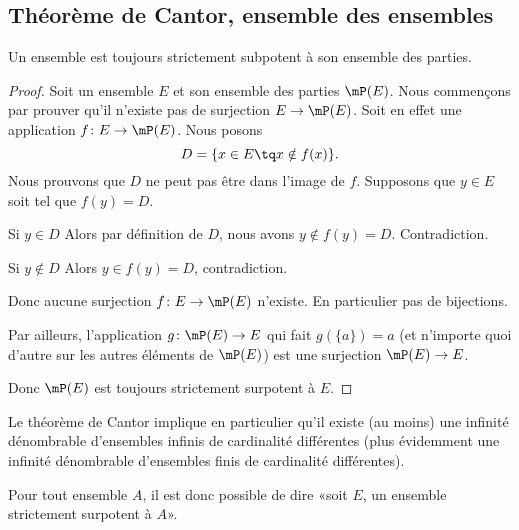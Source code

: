 \subsection{Théorème de Cantor, ensemble des ensembles}

\begin{theorem}     \label{THOooJPNFooWSxUhd}
    Un ensemble est toujours strictement subpotent à son ensemble des parties.
\end{theorem}

\begin{proof}
    Soit un ensemble \( E\) et son ensemble des parties \( \mP(E)\). Nous commençons par prouver qu'il n'existe pas de surjection \( E\to \mP(E)\). Soit en effet une application \( f\colon E\to \mP(E)\). Nous posons
    \begin{equation}
        D=\{ x\in E\tq x\notin f(x) \}.
    \end{equation}
    Nous prouvons que \( D\) ne peut pas être dans l'image de \( f\). Supposons que \( y\in E\) soit tel que \( f(y)=D\).
    \begin{subproof}
        \item[Si \( y\in D\)]
            Alors par définition de \( D\), nous avons \( y\notin f(y)=D\). Contradiction.
        \item[Si \( y\notin D\)]
            Alors \( y\in f(y)=D\), contradiction.
    \end{subproof}
    Donc aucune surjection \( f\colon E\to \mP(E)\) n'existe. En particulier pas de bijections.

    Par ailleurs, l'application \( g\colon \mP(E)\to E\) qui fait \( g(\{ a \})=a\) (et n'importe quoi d'autre sur les autres éléments de \( \mP(E)\)) est une surjection \( \mP(E)\to E\).

    Donc \( \mP(E)\) est toujours strictement surpotent à \( E\).
\end{proof}

\begin{normaltext}
    Le théorème de Cantor implique en particulier qu'il existe (au moins) une infinité dénombrable d'ensembles infinis de cardinalité différentes (plus évidemment une infinité dénombrable d'ensembles finis de cardinalité différentes).

    Pour tout ensemble \( A\), il est donc possible de dire «soit \( E\), un ensemble strictement surpotent à \( A\)».
\end{normaltext}

